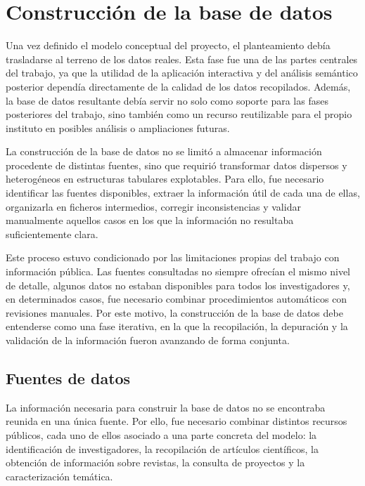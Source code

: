 \documentclass[11pt,spanish,listoffigures,listoftables]{tfgetsinf}
\begin{document}


\chapter{Construcción de la base de datos}

Una vez definido el modelo conceptual del proyecto, el planteamiento debía trasladarse al terreno de los datos reales. Esta fase fue una de las partes centrales del trabajo, ya que la utilidad de la aplicación interactiva y del análisis semántico posterior dependía directamente de la calidad de los datos recopilados. Además, la base de datos resultante debía servir no solo como soporte para las fases posteriores del trabajo, sino también como un recurso reutilizable para el propio instituto en posibles análisis o ampliaciones futuras.

La construcción de la base de datos no se limitó a almacenar información procedente de distintas fuentes, sino que requirió transformar datos dispersos y heterogéneos en estructuras tabulares explotables. Para ello, fue necesario identificar las fuentes disponibles, extraer la información útil de cada una de ellas, organizarla en ficheros intermedios, corregir inconsistencias y validar manualmente aquellos casos en los que la información no resultaba suficientemente clara.

Este proceso estuvo condicionado por las limitaciones propias del trabajo con información pública. Las fuentes consultadas no siempre ofrecían el mismo nivel de detalle, algunos datos no estaban disponibles para todos los investigadores y, en determinados casos, fue necesario combinar procedimientos automáticos con revisiones manuales. Por este motivo, la construcción de la base de datos debe entenderse como una fase iterativa, en la que la recopilación, la depuración y la validación de la información fueron avanzando de forma conjunta.

\section{Fuentes de datos}

La información necesaria para construir la base de datos no se encontraba reunida en una única fuente. Por ello, fue necesario combinar distintos recursos públicos, cada uno de ellos asociado a una parte concreta del modelo: la identificación de investigadores, la recopilación de artículos científicos, la obtención de información sobre revistas, la consulta de proyectos y la caracterización temática.
\end{document}
